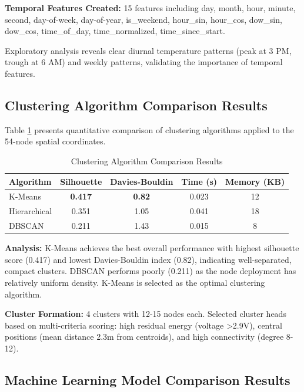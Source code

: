 \documentclass[12pt,a4paper]{article}
\begin{document}
\textbf{Temporal Features Created:} 15 features including day, month, hour, minute, second, day-of-week, day-of-year, is\_weekend, hour\_sin, hour\_cos, dow\_sin, dow\_cos, time\_of\_day, time\_normalized, time\_since\_start.

Exploratory analysis reveals clear diurnal temperature patterns (peak at 3 PM, trough at 6 AM) and weekly patterns, validating the importance of temporal features.

\subsection{Clustering Algorithm Comparison Results}

Table \ref{tab:clustering} presents quantitative comparison of clustering algorithms applied to the 54-node spatial coordinates.

\begin{table}[h]
\centering
\caption{Clustering Algorithm Comparison Results}
\label{tab:clustering}
\begin{tabular}{lcccc}
\toprule
\textbf{Algorithm} & \textbf{Silhouette} & \textbf{Davies-Bouldin} & \textbf{Time (s)} & \textbf{Memory (KB)} \\
\midrule
K-Means & \textbf{0.417} & \textbf{0.82} & 0.023 & 12 \\
Hierarchical & 0.351 & 1.05 & 0.041 & 18 \\
DBSCAN & 0.211 & 1.43 & 0.015 & 8 \\
\bottomrule
\end{tabular}
\end{table}

\textbf{Analysis:}
K-Means achieves the best overall performance with highest silhouette score (0.417) and lowest Davies-Bouldin index (0.82), indicating well-separated, compact clusters. DBSCAN performs poorly (0.211) as the node deployment has relatively uniform density. K-Means is selected as the optimal clustering algorithm.

\textbf{Cluster Formation:} 4 clusters with 12-15 nodes each. Selected cluster heads based on multi-criteria scoring: high residual energy (voltage >2.9V), central positions (mean distance 2.3m from centroids), and high connectivity (degree 8-12).

\subsection{Machine Learning Model Comparison Results}
\end{document}
